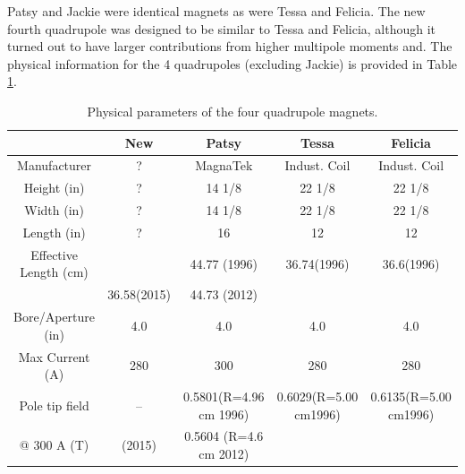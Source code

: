 \documentclass[12pt]{article}
\begin{document}
Patsy and Jackie were identical magnets as were Tessa and Felicia. The new fourth quadrupole was designed to be similar to Tessa and Felicia, although it turned out to have larger contributions from higher multipole moments and. The physical information for the 4 quadrupoles (excluding Jackie) is provided in Table \ref{tab:quad_info}.

\begin{table}
\begin{center}
\caption{\label{tab:quad_info}Physical parameters of the four quadrupole magnets.}
\begin{tabular}{|c|c|c|c|c|}
\hline
~                                &New             &Patsy                              &Tessa                            &Felicia\\ \hline
Manufacturer             &?                  &MagnaTek                       &Indust. Coil                   &Indust. Coil\\ \hline
Height (in)                  & ?                 &14 1/8                             &22 1/8                           &22 1/8\\ \hline
Width (in)                   &?                  &14 1/8                             &22 1/8                           &22 1/8\\ \hline
Length (in)                 &?                   &16                                  &12                                 &12\\ \hline
Effective Length (cm)&~                   &44.77 (1996)                  &36.74(1996)                  &36.6(1996)\\ 
~                                & 36.58(2015)&44.73 (2012)                   &~                                   &~\\ \hline
Bore/Aperture (in)      & 4.0              & 4.0                                 &4.0                                 &4.0\\ \hline
Max Current (A)         &280              &300                                 &280                                &280\\ \hline
Pole tip field               &--                 &0.5801(R=4.96 cm 1996)&0.6029(R=5.00 cm1996)&0.6135(R=5.00 cm1996)\\ 
@ 300 A (T)               &(2015)         &0.5604 (R=4.6 cm 2012)&~                                    &~\\ \hline
\end{tabular}
\end{center}
\end{table}
\end{document}
